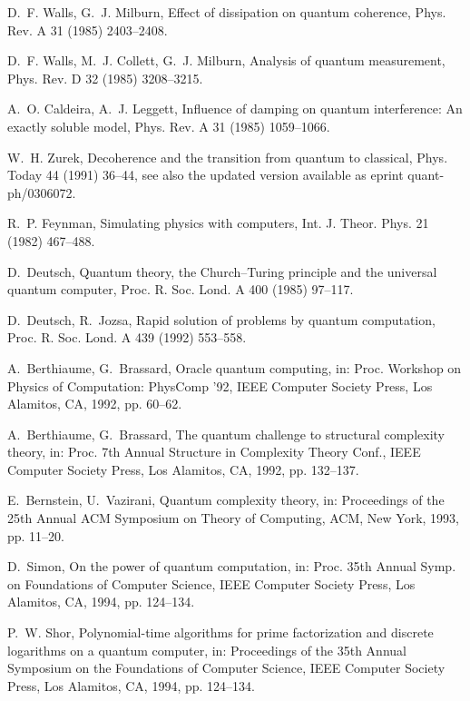 \documentclass[3p,sort&compress,12pt]{elsarticle}
\begin{document}
\begin{thebibliography}{100}
D.~F. Walls, G.~J. Milburn, Effect of dissipation on quantum coherence, Phys.
  Rev. A 31 (1985) 2403--2408.

D.~F. Walls, M.~J. Collett, G.~J. Milburn, Analysis of quantum measurement,
  Phys. Rev. D 32 (1985) 3208--3215.

A.~O. Caldeira, A.~J. Leggett, Influence of damping on quantum interference:
  {A}n exactly soluble model, Phys. Rev. A 31 (1985) 1059--1066.

W.~H. Zurek, Decoherence and the transition from quantum to classical, Phys.
  Today 44 (1991) 36--44, see also the updated version available as eprint
  quant-ph/0306072.

R.~P. Feynman, Simulating physics with computers, Int. J. Theor. Phys. 21
  (1982) 467--488.

D.~Deutsch, Quantum theory, the {C}hurch--{T}uring principle and the universal
  quantum computer, Proc. R. Soc. Lond. A 400 (1985) 97--117.

D.~Deutsch, R.~Jozsa, Rapid solution of problems by quantum computation, Proc.
  R. Soc. Lond. A 439 (1992) 553--558.

A.~Berthiaume, G.~Brassard, Oracle quantum computing, in: Proc. Workshop on
  Physics of Computation: PhysComp '92, IEEE Computer Society Press, Los
  Alamitos, CA, 1992, pp. 60--62.

A.~Berthiaume, G.~Brassard, The quantum challenge to structural complexity
  theory, in: Proc. 7th Annual Structure in Complexity Theory Conf., IEEE
  Computer Society Press, Los Alamitos, CA, 1992, pp. 132--137.

E.~Bernstein, U.~Vazirani, Quantum complexity theory, in: Proceedings of the
  25th Annual ACM Symposium on Theory of Computing, ACM, New York, 1993, pp.
  11--20.

D.~Simon, On the power of quantum computation, in: Proc. 35th Annual Symp. on
  Foundations of Computer Science, IEEE Computer Society Press, Los Alamitos,
  CA, 1994, pp. 124--134.

P.~W. Shor, Polynomial-time algorithms for prime factorization and discrete
  logarithms on a quantum computer, in: Proceedings of the 35th Annual
  Symposium on the Foundations of Computer Science, IEEE Computer Society
  Press, Los Alamitos, CA, 1994, pp. 124--134.


\end{thebibliography}
\end{document}
